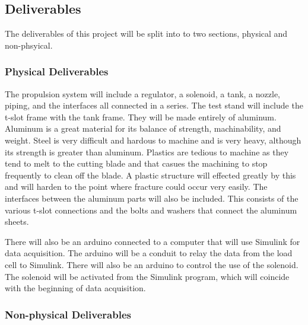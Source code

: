 \documentclass[conference]{IEEEtran} %
\begin{document}
\subsection{Deliverables}
\label{subsec:deliverables}
The deliverables of this project will be split into to two sections, physical and non-phsyical.

\subsubsection{Physical Deliverables}
\label{subsubsec: physical deliverables}

The propulsion system will include a regulator, a solenoid, a tank, a nozzle, piping, and the interfaces all connected in a series.
The test stand will include the t-slot frame with the tank frame. They will be made entirely of aluminum. Aluminum is a great material for its balance of strength, machinability, and
weight. Steel is very difficult and hardous to machine and is very heavy, although its strength is greater than aluminum. Plastics are tedious to machine as they tend to melt to the cutting
blade and that casues the machining to stop frequently to clean off the blade. A plastic structure will
effected greatly by this and will harden to the point where fracture could occur very easily. The interfaces between the
aluminum parts will also be included. This consists of the various t-slot connections and the bolts and washers that connect the aluminum sheets.

There will also be an arduino connected to a computer that will use Simulink for data acquisition. The arduino will be a conduit to relay the data from the load cell
to Simulink. There will also be an arduino to control the use of the solenoid. The solenoid will be activated from the Simulink program, which will coincide with
the beginning of data acquisition.

\subsubsection{Non-physical Deliverables}
\label{subsubsec: non-physical deliverables}
\end{document}
